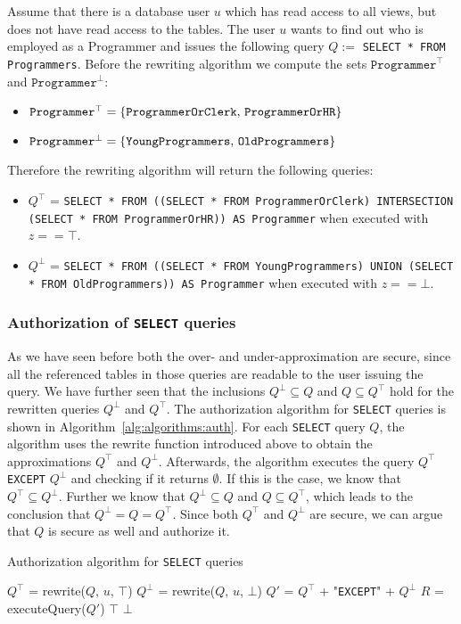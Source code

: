 %
Assume that there is a database user $u$ which has read access to all views, but does not have read access to the tables.
%
The user $u$ wants to find out who is employed as a Programmer and issues the following query $Q := $ \texttt{SELECT * FROM Programmers}.
%
Before the rewriting algorithm we compute the sets $\texttt{Programmer}^\top$ and $\texttt{Programmer}^\bot$:
\begin{itemize}
	\item $\texttt{Programmer}^\top = \lbrace \text{\texttt{ProgrammerOrClerk}, \texttt{ProgrammerOrHR}} \rbrace$ 
	\item $\texttt{Programmer}^\bot = \lbrace \text{\texttt{YoungProgrammers}, \texttt{OldProgrammers}} \rbrace$
\end{itemize}
%
Therefore the rewriting algorithm will return the following queries:
\begin{itemize}
	\item $Q^\top$ = \texttt{SELECT * FROM ((SELECT * FROM ProgrammerOrClerk) INTERSECTION (SELECT * FROM ProgrammerOrHR)) AS Programmer} when executed with $z == \top$.
	\item $Q^\bot$ = \texttt{SELECT * FROM ((SELECT * FROM YoungProgrammers) UNION (SELECT * FROM OldProgrammers)) AS Programmer} when executed with $z == \bot$.
\end{itemize}

\subsubsection{Authorization of \texttt{SELECT} queries}

As we have seen before both the over- and under-approximation are secure, since all the referenced tables in those queries are readable to the user issuing the query.
%
We have further seen that the inclusions $Q^\bot \subseteq Q$ and $Q \subseteq Q^\top$ hold for the rewritten queries $Q^\bot$ and $Q^\top$.
%
The authorization algorithm for \texttt{SELECT} queries is shown in Algorithm~\ref{alg:algorithms:auth}.
%
For each \texttt{SELECT} query $Q$, the algorithm uses the rewrite function introduced above to obtain the approximations $Q^\top$ and $Q^\bot$.
%
Afterwards, the algorithm executes the query  $Q^\top$ \texttt{EXCEPT} $Q^\bot$ and checking if it returns $\emptyset$.
%
If this is the case, we know that $Q^\top \subseteq Q^\bot$.
%
Further we know that $Q^\bot \subseteq Q$ and $Q \subseteq Q^\top$, which leads to the conclusion that $Q^\bot = Q = Q^\top$.
%
Since both $Q^\top$ and $Q^\bot$ are secure, we can argue that $Q$ is secure as well and authorize it.
%
\begin{algorithm}
\caption{Authorization algorithm for \texttt{SELECT} queries}
\label{alg:algorithms:auth}
	\SetAlgoLined
	$Q^\top$ = rewrite($Q$, $u$, $\top$)\;
	$Q^\bot$ = rewrite($Q$, $u$, $\bot$)\;
	$Q'$ = $Q^\top$ + "\texttt{EXCEPT}" + $Q^\bot$\;
	$R$ = executeQuery($Q'$)\;
		{\Return $\top$ \;}
		{\Return $\bot$ \;}
\end{algorithm}

